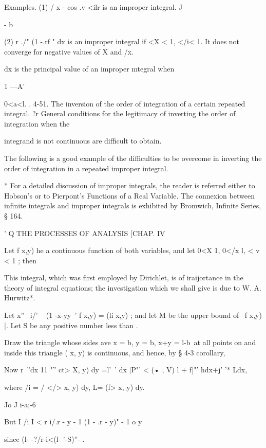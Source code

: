 Examples. (1) / x - cos .v <ilr is an improper integral. J



- b



(2) r ./" (1 -.rf " dx is an improper integral if <X < 1, </i< 1. It
does not converge for negative values of X and /x.

dx is the principal value of an improper mtegral when

1 —A'

0<a<l. . 4-51. The inversion of the order of integration of a certain
repeated integral. ?r General conditions for the legitimacy of
inverting the order of integration when the

integrand is not continuous are difficult to obtain.

The following is a good example of the difficulties to be overcome in
inverting the order of integration in a repeated improper integral.

* For a detailed discussion of improper integrals, the reader is
referred either to Hobson's or to Pierpont's Functions of a Real
Variable. The connexion between infinite integrals and improper
integrals is exhibited by Bromwich, Infinite Series, § 164.



' Q THE PROCESSES OF ANALYSIS [CHAP. IV

Let f x,y) he a continuous function of both variables, and let 0<X 1,
0</x l, < v < 1 ; then



This integral, which was first employed by Dirichlet, is of
iraijortance in the theory of integral equations; the investigation
which we shall give is due to W. A. Hurwitz*.

Let x''~ i/' ~ (1 -x-yy~' f x,y) = (li x,y) ; and let M be the upper
bound of \ f x,y) |. Let S be any positive number less than .

Draw the triangle whose sides ave x = b, y = b, x+y = l-b\ at all
points on and inside this triangle ( x, y) is continuous, and hence,
by § 4-3 corollary,

Now r~''dx 11 "'' ct> X, y) dy =l'~' dx |P"' < (• , V) l + f]"' hdx+j'
'* Ldx,

where /i = / </> x, y) dy, L= (f> x, y) dy.

Jo J i-a;-6

But I /i I < r i/.r - y - 1 (1 - .r - y)" - 1 o y

since (l- -?/r-i<(l- '-S)''- .

